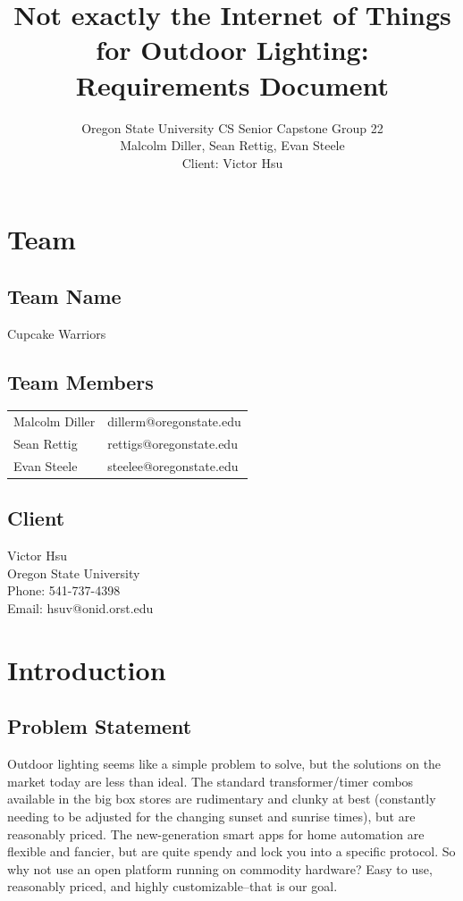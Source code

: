 \documentclass[12pt]{article}
\title{Not exactly the Internet of Things for Outdoor Lighting: Requirements Document}
\author{Oregon State University CS Senior Capstone Group 22\\Malcolm Diller, Sean Rettig, Evan Steele\\Client: Victor Hsu}
\begin{document}
 

\maketitle

\pagebreak

\tableofcontents

\pagebreak

\section{Team}

\subsection{Team Name}

Cupcake Warriors

\subsection{Team Members}

\begin{tabular}{ l l } 
    Malcolm Diller & dillerm@oregonstate.edu\\ 
    Sean Rettig & rettigs@oregonstate.edu\\
    Evan Steele & steelee@oregonstate.edu\\ \end{tabular}

\subsection{Client}

Victor Hsu\\
Oregon State University\\
Phone: 541-737-4398\\
Email: hsuv@onid.orst.edu

\section{Introduction}

\subsection{Problem Statement}

Outdoor lighting seems like a simple problem to solve, but the solutions on the
market today are less than ideal.  The standard transformer/timer combos
available in the big box stores are rudimentary and clunky at best (constantly
needing to be adjusted for the changing sunset and sunrise times), but are
reasonably priced. The new-generation smart apps for home automation are
flexible and fancier, but are quite spendy and lock you into a specific
protocol.  So why not use an open platform running on commodity hardware?  Easy
to use, reasonably priced, and highly customizable--that is our goal.
\end{document}
